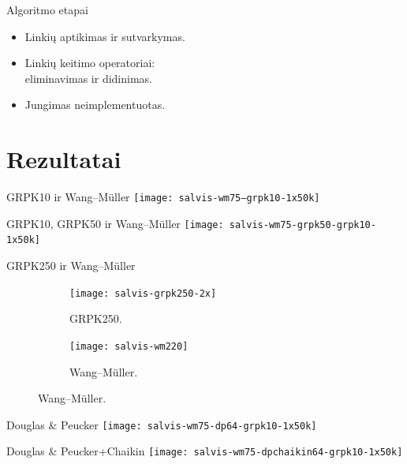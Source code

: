 \documentclass[14pt]{beamer}
\newcommand{\DP}{Douglas \& Peucker}
\newcommand{\WM}{Wang--M{\"u}ller}
\begin{document}
\begin{frame}{Algoritmo etapai}
  \begin{itemize}[<+->]
    \item Linkių aptikimas ir sutvarkymas.
    \item Linkių keitimo operatoriai: \\ eliminavimas ir didinimas.
    \item Jungimas neimplementuotas.
  \end{itemize}
\end{frame}

\section{Rezultatai}

\begin{frame}{GRPK10 ir {\WM}}
  \texttt{[image: salvis-wm75--grpk10-1x50k]}
\end{frame}

\begin{frame}{GRPK10, GRPK50 ir {\WM}}
  \texttt{[image: salvis-wm75-grpk50-grpk10-1x50k]}
\end{frame}

\begin{frame}{GRPK250 ir {\WM}}
  \begin{figure}[h!]
    \centering
    \begin{subfigure}[b]{.49\textwidth}
      \texttt{[image: salvis-grpk250-2x]}
      \caption{GRPK250.}
    \end{subfigure}
    \hfill
    \begin{subfigure}[b]{.49\textwidth}
      \centering
      \texttt{[image: salvis-wm220]}
      \caption{{\WM}.}
    \end{subfigure}
  \end{figure}
\end{frame}

\begin{frame}{{\DP}}
  \texttt{[image: salvis-wm75-dp64-grpk10-1x50k]}
\end{frame}

\begin{frame}{{\DP}+Chaikin}
  \texttt{[image: salvis-wm75-dpchaikin64-grpk10-1x50k]}
\end{frame}
\end{document}
